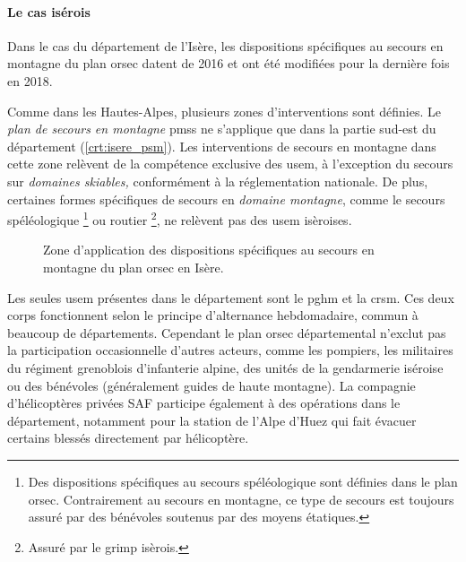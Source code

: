 \paragraph{Le cas isérois}

Dans le cas du département de l'Isère, les dispositions spécifiques au
secours en montagne du plan \ac{orsec} datent de 2016 et ont été
modifiées pour la dernière fois en 2018.

Comme dans les Hautes-Alpes, plusieurs zones d'interventions sont
définies. Le \emph{plan de secours en montagne} \acp{pms} ne
s'applique que dans la partie sud-est du département
(\autoref{crt:isere_psm}). Les interventions de secours en montagne
dans cette zone relèvent de la compétence exclusive des \ac{usem}, à
l'exception du secours sur \emph{domaines skiables,} conformément à la
réglementation nationale. De plus, certaines formes spécifiques de
secours en \emph{domaine montagne}, comme le secours spéléologique
\footnote{Des dispositions spécifiques au secours spéléologique sont
  définies dans le plan \ac{orsec}. Contrairement au secours en
  montagne, ce type de secours est toujours assuré par des bénévoles
  soutenus par des moyens étatiques.} ou routier \footnote{Assuré par
  le \ac{grimp} isèrois.}, ne relèvent pas des \ac{usem} isèroises.

\begin{figure}
  \centering
  
  \caption{Zone d'application des dispositions spécifiques au secours
    en montagne du plan \ac{orsec} en Isère.}
  \label{crt:isere_psm}
\end{figure}

Les seules \ac{usem} présentes dans le département sont le \ac{pghm}
et la \ac{crsm}. Ces deux corps fonctionnent selon le principe
d'alternance hebdomadaire, commun à beaucoup de
départements. Cependant le plan \ac{orsec} départemental n’exclut pas
la participation occasionnelle d'autres acteurs, comme les pompiers,
les militaires du régiment grenoblois d’infanterie alpine, des unités
de la gendarmerie iséroise ou des bénévoles (généralement guides de
haute montagne).
La compagnie d'hélicoptères privées SAF participe également à des
opérations dans le département, notamment pour la station de l'Alpe
d'Huez qui fait évacuer certains blessés directement par hélicoptère.

